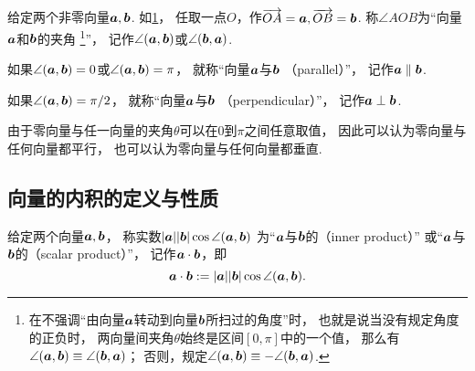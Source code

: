 \begin{definition}
给定两个非零向量\(\boldsymbol{a},\boldsymbol{b}\).
如\cref{figure:解析几何.向量的夹角}，
任取一点\(O\)，作\(\overrightarrow{OA}=\boldsymbol{a},\overrightarrow{OB}=\boldsymbol{b}\).
称\(\angle{AOB}\)为“向量\(\boldsymbol{a}\)和\(\boldsymbol{b}\)的夹角%
\footnote{%
在不强调“由向量\(\boldsymbol{a}\)转动到向量\(\boldsymbol{b}\)所扫过的角度”时，
也就是说当没有规定角度的正负时，
两向量间夹角\(\theta\)始终是区间\([0,\pi]\)中的一个值，
那么有\(\angle(\boldsymbol{a},\boldsymbol{b}) \equiv \angle(\boldsymbol{b},\boldsymbol{a})\)；%
否则，规定\(\angle(\boldsymbol{a},\boldsymbol{b}) \equiv -\angle(\boldsymbol{b},\boldsymbol{a})\).%
}”，
记作\(\angle(\boldsymbol{a},\boldsymbol{b})\)或\(\angle(\boldsymbol{b},\boldsymbol{a})\).

如果\(\angle(\boldsymbol{a},\boldsymbol{b}) = 0\)或\(\angle(\boldsymbol{a},\boldsymbol{b}) = \pi\)，
就称“向量\(\boldsymbol{a}\)与\(\boldsymbol{b}\) （parallel）”，
记作\(\boldsymbol{a}\parallel\boldsymbol{b}\).

如果\(\angle(\boldsymbol{a},\boldsymbol{b}) = \pi/2\)，
就称“向量\(\boldsymbol{a}\)与\(\boldsymbol{b}\) （perpendicular）”，
记作\(\boldsymbol{a}\perp\boldsymbol{b}\).
\end{definition}

\begin{figure}[htb]
	\centering
	\caption{}
	\label{figure:解析几何.向量的夹角}
\end{figure}

由于零向量与任一向量的夹角\(\theta\)可以在\(0\)到\(\pi\)之间任意取值，
因此可以认为零向量与任何向量都平行，
也可以认为零向量与任何向量都垂直.

\subsection{向量的内积的定义与性质}
\begin{definition}
给定两个向量\(\boldsymbol{a},\boldsymbol{b}\)，
称实数\(\abs{\boldsymbol{a}} \abs{\boldsymbol{b}} \cos\angle(\boldsymbol{a},\boldsymbol{b})\)
为“\(\boldsymbol{a}\)与\(\boldsymbol{b}\)的（inner product）”
或“\(\boldsymbol{a}\)与\(\boldsymbol{b}\)的（scalar product）”，
记作\(\boldsymbol{a} \cdot \boldsymbol{b}\)，即
\begin{equation}
	\boldsymbol{a} \cdot \boldsymbol{b}
	:=
	\abs{\boldsymbol{a}} \abs{\boldsymbol{b}} \cos\angle(\boldsymbol{a},\boldsymbol{b}).
\end{equation}
\end{definition}

